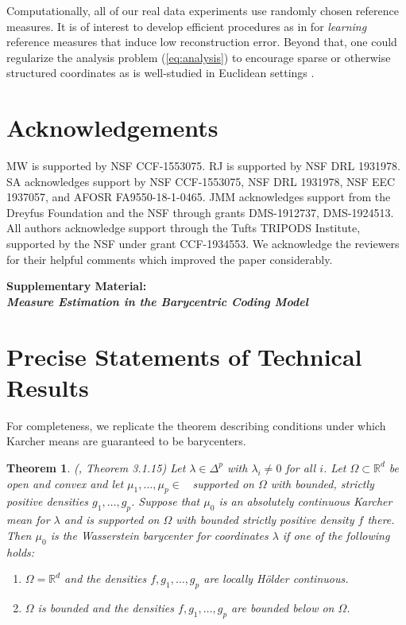 \documentclass[nohyperref]{article}
\DeclareMathOperator{\Pac}{\mathcal{P}_{2,ac}(\mathbb{R}^d)}
\newtheorem{theorem}{Theorem}
\theoremstyle{definition}
\begin{document}
Computationally, all of our real data experiments use randomly chosen reference measures.  It is of interest to develop efficient procedures as in \cite{schmitz2018wasserstein} for \emph{learning} reference measures that induce low reconstruction error.  Beyond that, one could regularize the analysis problem (\ref{eq:analysis}) to encourage sparse or otherwise structured coordinates as is well-studied in Euclidean settings \cite{aharon2006k}.

\section*{Acknowledgements}

MW is supported by NSF CCF-1553075. RJ is supported by NSF DRL 1931978.  SA acknowledges support by NSF CCF-1553075, NSF DRL 1931978, NSF EEC 1937057, and AFOSR FA9550-18-1-0465.  JMM acknowledges support from the Dreyfus Foundation and the NSF through grants DMS-1912737, DMS-1924513.  All authors acknowledge support through the Tufts TRIPODS Institute, supported by the NSF under grant CCF-1934553.  We acknowledge the reviewers for their helpful comments which improved the paper considerably.  




\onecolumn
\setcounter{section}{0}

\begin{center}
    \textbf{\large{Supplementary Material: \\\emph{Measure Estimation in the Barycentric Coding Model}}}
\end{center}

\section{Precise Statements of Technical Results}
\label{SM:PreciseStatements}

For completeness, we replicate the theorem describing conditions under which Karcher means are guaranteed to be barycenters.
\begin{theorem}(\citep{panaretos2020invitation}, Theorem 3.1.15) \label{thm:karcher}
    Let $\lambda \in \Delta^p$ with $\lambda_{i} \neq 0$ for all $i$. Let $\Omega \subset \mathbb{R}^d$ be open and convex and let $\mu_1,\dots,\mu_p \in \Pac$ supported on $\Omega$ with bounded, strictly positive densities $g_1,\dots,g_p$. Suppose that $\mu_0$ is an absolutely continuous Karcher mean for $\lambda$ and is supported on $\Omega$ with bounded strictly positive density $f$ there.  Then $\mu_0$ is the Wasserstein barycenter for coordinates $\lambda$ if one of the following holds:
    \begin{enumerate}[(1)]\setlength\itemsep{-4pt}
        \item $\Omega = \mathbb{R}^d$ and the densities $f,g_1,\dots,g_p$ are locally H\"older continuous.
        \item $\Omega$ is bounded and the densities $f,g_1,\dots,g_p$ are bounded below on $\Omega$.
    \end{enumerate}
\end{theorem}
\end{document}
